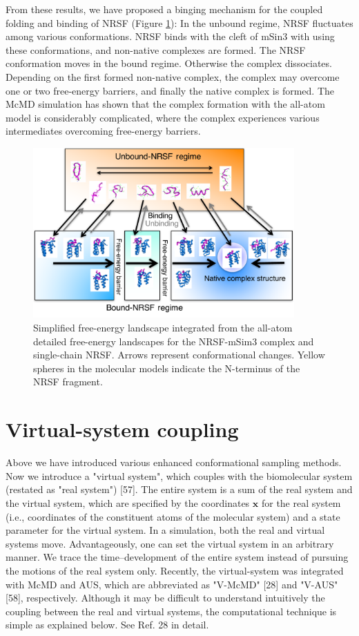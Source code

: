 From these results, we have proposed a binging mechanism for the coupled folding and binding of NRSF (Figure \ref{fig:msin3_nrsf_regime.pdf}): In the unbound regime, NRSF fluctuates among various conformations. NRSF binds with the cleft of mSin3 with using these conformations, and non-native complexes are formed. The NRSF conformation moves in the bound regime. Otherwise the complex dissociates. Depending on the first formed non-native complex, the complex may overcome one or two free-energy barriers, and finally the native complex is formed. The McMD simulation has shown that the complex formation with the all-atom model is considerably complicated, where the complex experiences various intermediates overcoming free-energy barriers.
\begin{figure}
  \centering
  \includegraphics[width=10cm]{../enhance_rev/figures/msin3_nrsf_regime.pdf}
  \caption{\label{fig:msin3_nrsf_regime.pdf} Simplified free-energy landscape integrated from the all-atom detailed free-energy landscapes for the NRSF-mSim3 complex and single-chain NRSF. Arrows represent conformational changes. Yellow spheres in the molecular models indicate the N-terminus of the NRSF fragment.}
\end{figure}

\section{Virtual-system coupling}
Above we have introduced various enhanced conformational sampling methods. Now we introduce a "virtual system", which couples with the biomolecular system (restated as "real system") [57]. The entire system is a sum of the real system and the virtual system, which are specified by the coordinates $\bm{x}$ for the real system (i.e., coordinates of the constituent atoms of the molecular system) and a state parameter for the virtual system. In a simulation, both the real and virtual systems move. Advantageously, one can set the virtual system in an arbitrary manner. We trace the time–development of the entire system instead of pursuing the motions of the real system only. Recently, the virtual-system was integrated with McMD and AUS, which are abbreviated as "V-McMD" [28] and "V-AUS" [58], respectively. Although it may be difficult to understand intuitively the coupling between the real and virtual systems, the computational technique is simple as explained below. See Ref. 28 in detail.

